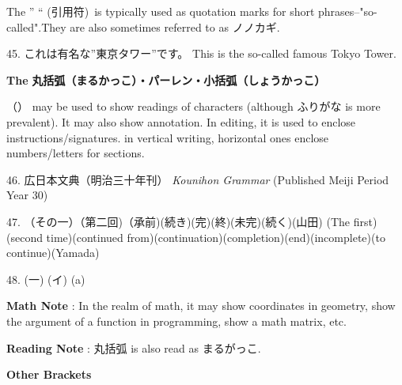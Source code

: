 \par{ The ” “ (引用符) is typically used as quotation marks for short phrases--"so-called".They are also sometimes referred to as ノノカギ. }

\par{45. これは有名な”東京タワー”です。 \hfill\break
This is the so-called famous Tokyo Tower. }

\begin{center}
\textbf{The }\textbf{丸括弧（まるかっこ）・パーレン・小括弧（しょうかっこ） }
\end{center}

\par{（） may be used to show readings of characters (although ふりがな is more prevalent). It may also show annotation. In editing, it is used to enclose instructions\slash signatures. in vertical writing, horizontal ones enclose numbers\slash letters for sections. }

\par{46. 広日本文典（明治三十年刊） \hfill\break
 \emph{Kounihon Grammar }(Published Meiji Period Year 30) }

\par{47. （その一）（第二回)（承前)(続き)(完)(終)(未完)(続く)(山田) \hfill\break
(The first)(second time)(continued from)(continuation)(completion)(end)(incomplete)(to continue)(Yamada) }

\par{48. (一) \hfill\break
(イ) \hfill\break
(a) }

\par{\textbf{Math Note }: In the realm of math, it may show coordinates in geometry, show the argument of a function in programming, show a math matrix, etc. }

\par{\textbf{Reading Note }: 丸括弧 is also read as まるがっこ. }

\begin{center}
\textbf{Other Brackets }
\end{center}

